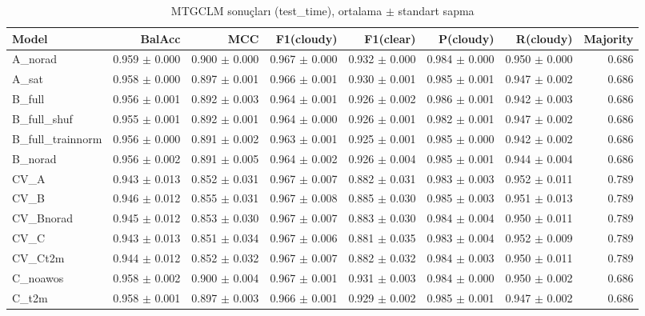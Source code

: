\begin{table}[ht]
\centering
\caption{MTGCLM sonuçları (test_time), ortalama $\pm$ standart sapma}
\label{tab:results_test_time}
\begin{tabular}{lrrrrrrr}
\hline
Model & BalAcc & MCC & F1(cloudy) & F1(clear) & P(cloudy) & R(cloudy) & Majority \\
\hline
A\_norad & 0.959 $\pm$ 0.000 & 0.900 $\pm$ 0.000 & 0.967 $\pm$ 0.000 & 0.932 $\pm$ 0.000 & 0.984 $\pm$ 0.000 & 0.950 $\pm$ 0.000 & 0.686 \\
A\_sat & 0.958 $\pm$ 0.000 & 0.897 $\pm$ 0.001 & 0.966 $\pm$ 0.001 & 0.930 $\pm$ 0.001 & 0.985 $\pm$ 0.001 & 0.947 $\pm$ 0.002 & 0.686 \\
B\_full & 0.956 $\pm$ 0.001 & 0.892 $\pm$ 0.003 & 0.964 $\pm$ 0.001 & 0.926 $\pm$ 0.002 & 0.986 $\pm$ 0.001 & 0.942 $\pm$ 0.003 & 0.686 \\
B\_full\_shuf & 0.955 $\pm$ 0.001 & 0.892 $\pm$ 0.001 & 0.964 $\pm$ 0.000 & 0.926 $\pm$ 0.001 & 0.982 $\pm$ 0.001 & 0.947 $\pm$ 0.002 & 0.686 \\
B\_full\_trainnorm & 0.956 $\pm$ 0.000 & 0.891 $\pm$ 0.002 & 0.963 $\pm$ 0.001 & 0.925 $\pm$ 0.001 & 0.985 $\pm$ 0.000 & 0.942 $\pm$ 0.002 & 0.686 \\
B\_norad & 0.956 $\pm$ 0.002 & 0.891 $\pm$ 0.005 & 0.964 $\pm$ 0.002 & 0.926 $\pm$ 0.004 & 0.985 $\pm$ 0.001 & 0.944 $\pm$ 0.004 & 0.686 \\
CV\_A & 0.943 $\pm$ 0.013 & 0.852 $\pm$ 0.031 & 0.967 $\pm$ 0.007 & 0.882 $\pm$ 0.031 & 0.983 $\pm$ 0.003 & 0.952 $\pm$ 0.011 & 0.789 \\
CV\_B & 0.946 $\pm$ 0.012 & 0.855 $\pm$ 0.031 & 0.967 $\pm$ 0.008 & 0.885 $\pm$ 0.030 & 0.985 $\pm$ 0.003 & 0.951 $\pm$ 0.013 & 0.789 \\
CV\_Bnorad & 0.945 $\pm$ 0.012 & 0.853 $\pm$ 0.030 & 0.967 $\pm$ 0.007 & 0.883 $\pm$ 0.030 & 0.984 $\pm$ 0.004 & 0.950 $\pm$ 0.011 & 0.789 \\
CV\_C & 0.943 $\pm$ 0.013 & 0.851 $\pm$ 0.034 & 0.967 $\pm$ 0.006 & 0.881 $\pm$ 0.035 & 0.983 $\pm$ 0.004 & 0.952 $\pm$ 0.009 & 0.789 \\
CV\_Ct2m & 0.944 $\pm$ 0.012 & 0.852 $\pm$ 0.032 & 0.967 $\pm$ 0.007 & 0.882 $\pm$ 0.032 & 0.984 $\pm$ 0.003 & 0.950 $\pm$ 0.011 & 0.789 \\
C\_noawos & 0.958 $\pm$ 0.002 & 0.900 $\pm$ 0.004 & 0.967 $\pm$ 0.001 & 0.931 $\pm$ 0.003 & 0.984 $\pm$ 0.000 & 0.950 $\pm$ 0.002 & 0.686 \\
C\_t2m & 0.958 $\pm$ 0.001 & 0.897 $\pm$ 0.003 & 0.966 $\pm$ 0.001 & 0.929 $\pm$ 0.002 & 0.985 $\pm$ 0.001 & 0.947 $\pm$ 0.002 & 0.686 \\

\end{tabular}
\end{table}
